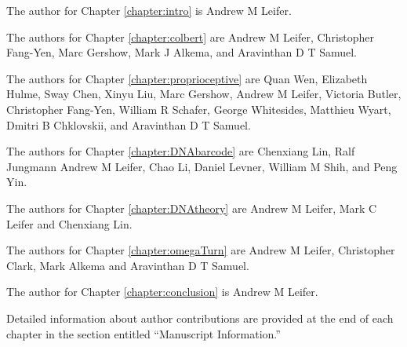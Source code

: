 \indent
The author for Chapter \ref{chapter:intro} is Andrew M Leifer.

The authors for Chapter \ref{chapter:colbert} are Andrew M Leifer, Christopher Fang-Yen, Marc Gershow, Mark J Alkema, and Aravinthan D T Samuel.


The authors for Chapter \ref{chapter:proprioceptive} are Quan Wen, Elizabeth Hulme, Sway Chen, Xinyu Liu, Marc Gershow, Andrew M Leifer, Victoria Butler, Christopher Fang-Yen, William R Schafer, George Whitesides, Matthieu Wyart, Dmitri B Chklovskii, and Aravinthan D T Samuel.


The authors for Chapter \ref{chapter:DNAbarcode} are Chenxiang Lin, Ralf Jungmann Andrew M Leifer, 
Chao Li, Daniel Levner, William M Shih, and Peng Yin.


The authors for Chapter \ref{chapter:DNAtheory} are Andrew M Leifer, Mark C Leifer and  Chenxiang Lin.

The authors for Chapter \ref{chapter:omegaTurn} are Andrew M Leifer, Christopher Clark, Mark Alkema and Aravinthan D T Samuel.

The author for Chapter \ref{chapter:conclusion} is Andrew M Leifer.

Detailed information about author contributions are provided at the end of each chapter in the section entitled ``Manuscript Information.'' 